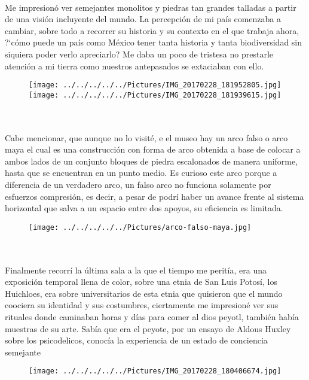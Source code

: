 \documentclass[10pt,a4paper]{article}
\begin{document}
\\
Me impresion\'{o} ver semejantes monolitos y piedras tan grandes talladas a partir de una visi\'{o}n incluyente del mundo. La percepci\'{o}n de mi pa\'{i}s comenzaba a cambiar, sobre todo a recorrer su historia y su contexto en el que trabaja ahora, ?`c\'{o}mo puede un pa\'{i}s como M\'{e}xico tener tanta historia y tanta biodiversidad sin siquiera poder verlo apreciarlo? Me daba un poco de tristesa no prestarle atenci\'{o}n a mi tierra como nuestros antepasados se extaciaban con ello.\\
\begin{figure}[hbtp]
\centering 
\texttt{[image: ../../../../../Pictures/IMG\_20170228\_181952805.jpg]} 
\texttt{[image: ../../../../../Pictures/IMG\_20170228\_181939615.jpg]}    
\end{figure}
\\
\\
Cabe mencionar, que aunque no lo visit\'{e}, e el museo hay un arco falso o arco maya el cual es una construcci\'{o}n con forma de arco obtenida a base de colocar a ambos lados de un conjunto bloques de piedra escalonados de manera uniforme, hasta que se encuentran en un punto medio. Es curioso este arco porque a diferencia de un verdadero arco, un falso arco no funciona solamente por esfuerzos compresi\'{o}n, es decir, a pesar de podr\'{i} haber un avance frente al sistema horizontal que salva a un espacio entre dos apoyos, su eficiencia es limitada.\\
\begin{figure}[hbtp]
\centering
\texttt{[image: ../../../../../Pictures/arco-falso-maya.jpg]} 
\end{figure}
\\
\pagebreak
\\
Finalmente recorr\'{i} la \'{u}ltima sala a la que el tiempo me perit\'{i}a, era una exposici\'{o}n temporal llena de color, sobre una etnia de San Luis Potos\'{i}, los Huichloes,  era sobre universitarios de esta etnia que quisieron que el mundo coociera su identidad y sus costumbres, ciertamente me impresion\'{e} ver sus rituales donde caminaban horas y d\'{i}as para comer al dios peyotl, tambi\'{e}n hab\'{i}a muestras de su arte. Sab\'{i}a que era el peyote, por un ensayo de Aldous Huxley sobre los psicodelicos, conoc\'{i}a la experiencia de un estado de conciencia semejante\\
\begin{figure}[hbtp]
\centering
\texttt{[image: ../../../../../Pictures/IMG\_20170228\_180406674.jpg]}  
\end{figure}
\end{document}
